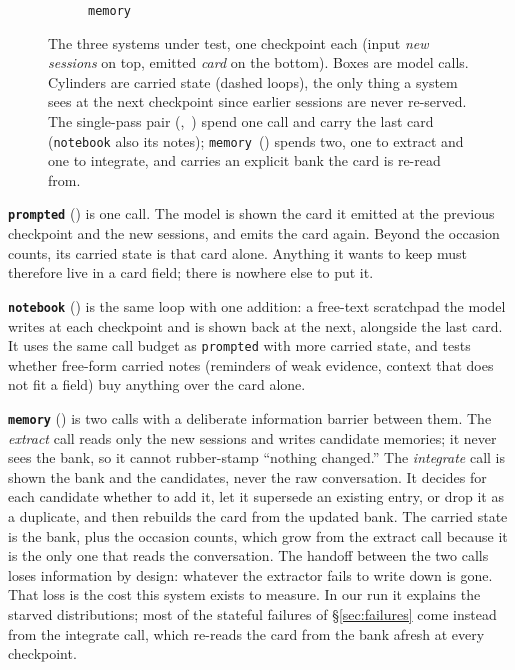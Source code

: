 \documentclass{article}
\begin{document}
\begin{figure}[h]
\begin{subfigure}[b]{0.31\linewidth}
    \caption{\texttt{memory}}
    \label{fig:sut-memory}
  \end{subfigure}
  \caption{The three systems under test, one checkpoint each (input \emph{new sessions} on top,
  emitted \emph{card} on the bottom). Boxes are model calls. Cylinders are carried
  state (dashed loops), the only thing a system sees at the next checkpoint since earlier sessions
  are never re-served. The single-pass pair (,~)
  spend one call and carry the last card (\texttt{notebook} also its notes); \texttt{memory}~() spends two,
  one to extract and one to integrate, and carries an explicit bank the card is re-read from.}
  \label{fig:suts}
\end{figure}

\textbf{\texttt{prompted}} () is one call. The model is shown the card it
emitted at the previous checkpoint and the new sessions, and emits the card again. Beyond the
occasion counts, its carried state is that card alone. Anything it wants to keep must therefore live in a card field; there is nowhere else to put it.

\textbf{\texttt{notebook}} () is the same loop with one addition: a
free-text scratchpad the model writes at each checkpoint and is shown back at the next, alongside
the last card. It uses the same call budget as \texttt{prompted} with more carried state, and tests
whether free-form carried notes (reminders of weak evidence, context that does not fit a field) buy
anything over the card alone.

\textbf{\texttt{memory}} () is two calls with a deliberate information
barrier between them. The \emph{extract} call reads only the new sessions and writes candidate
memories; it never sees the bank, so it cannot rubber-stamp ``nothing changed.'' The \emph{integrate}
call is shown the bank and the candidates, never the raw conversation. It decides for each
candidate whether to add it, let it supersede an existing entry, or drop it as a duplicate, and then
rebuilds the card from the updated bank. The carried state is the bank, plus the occasion counts,
which grow from the extract call because it is the only one that reads the conversation. The handoff between the
two calls loses information by design: whatever the extractor fails to write down is gone. That
loss is the cost this system exists to measure. In our run it explains the starved distributions;
most of the stateful failures of \S\ref{sec:failures} come instead from the integrate call, which
re-reads the card from the bank afresh at every checkpoint.
\end{document}
